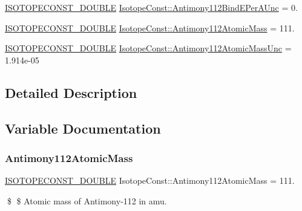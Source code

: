 \begin{DoxyCompactItemize}
\mbox{\hyperlink{group___isotope_const-_macros_ga8f45a7272ce02c0b4c65c44636ed719a}{I\+S\+O\+T\+O\+P\+E\+C\+O\+N\+S\+T\+\_\+\+D\+O\+U\+B\+LE}} \mbox{\hyperlink{group___isotope_const-_antimony-_sb112_ga1fbba70a15073228dc7120ddf16d1810}{Isotope\+Const\+::\+Antimony112\+Bind\+E\+Per\+A\+Unc}} = 0.
\item 
\mbox{\hyperlink{group___isotope_const-_macros_ga8f45a7272ce02c0b4c65c44636ed719a}{I\+S\+O\+T\+O\+P\+E\+C\+O\+N\+S\+T\+\_\+\+D\+O\+U\+B\+LE}} \mbox{\hyperlink{group___isotope_const-_antimony-_sb112_ga157bb8f0c515c8cd1d780e2533e69784}{Isotope\+Const\+::\+Antimony112\+Atomic\+Mass}} = 111.
\item 
\mbox{\hyperlink{group___isotope_const-_macros_ga8f45a7272ce02c0b4c65c44636ed719a}{I\+S\+O\+T\+O\+P\+E\+C\+O\+N\+S\+T\+\_\+\+D\+O\+U\+B\+LE}} \mbox{\hyperlink{group___isotope_const-_antimony-_sb112_ga4990120edebd36a32929a88cf72daa28}{Isotope\+Const\+::\+Antimony112\+Atomic\+Mass\+Unc}} = 1.\+914e-\/05
\end{DoxyCompactItemize}


\subsection{Detailed Description}


\subsection{Variable Documentation}
\mbox{\label{group___isotope_const-_antimony-_sb112_ga157bb8f0c515c8cd1d780e2533e69784}} 
\subsubsection{\texorpdfstring{Antimony112\+Atomic\+Mass}{Antimony112AtomicMass}}
{\footnotesize\ttfamily \mbox{\hyperlink{group___isotope_const-_macros_ga8f45a7272ce02c0b4c65c44636ed719a}{I\+S\+O\+T\+O\+P\+E\+C\+O\+N\+S\+T\+\_\+\+D\+O\+U\+B\+LE}} Isotope\+Const\+::\+Antimony112\+Atomic\+Mass = 111.}

\$ \$ Atomic mass of Antimony-\/112 in amu. \mbox{\label{group___isotope_const-_antimony-_sb112_ga4990120edebd36a32929a88cf72daa28}} 
